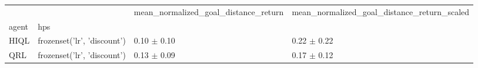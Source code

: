 \begin{tabular}{llll}
\toprule
 &  & mean_normalized_goal_distance_return & mean_normalized_goal_distance_return_scaled \\
agent & hps &  &  \\
\midrule
HIQL & frozenset({'lr', 'discount'}) & 0.10 $\pm$ 0.10 & 0.22 $\pm$ 0.22 \\
\cline{1-4}
QRL & frozenset({'lr', 'discount'}) & 0.13 $\pm$ 0.09 & 0.17 $\pm$ 0.12 \\
\cline{1-4}
\bottomrule
\end{tabular}
